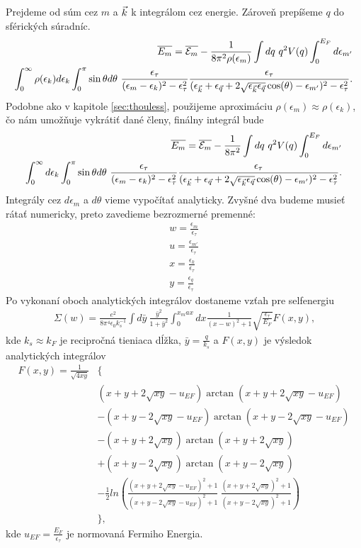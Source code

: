 Prejdeme od súm cez $m$ a $\vec{k}$ k integrálom cez energie. Zároveň prepíšeme $q$ do sférických súradníc. 
\begin{align}
\label{eq:05energy4}
\notag
\overline{E_m}=\overline{\E_m} - \frac{1}{8\pi^2\rho(\epsilon_m)} \int dq\ q^2 V(q) \int_0^{E_F} d\epsilon_{m'} \\
\int_0^{\infty} \rho(\epsilon_k) d \epsilon_k \int_0^\pi \sin\theta d\theta\ \frac{\epsilon_\tau}{(\epsilon_m-\epsilon_k)^2-\epsilon_\tau^2}\frac{\epsilon_\tau}{(\epsilon_{\vk}+\epsilon_{\vq}+2\sqrt{\epsilon_{\vk}\epsilon_{\vq}}\cos(\theta)-\epsilon_{m'})^2-\epsilon_\tau^2} \text{.} 
\end{align}
Podobne ako v kapitole \ref{sec:thouless}, použijeme aproximáciu $\rho(\epsilon_m)\approx\rho(\epsilon_k)$, čo nám umožňuje vykrátiť dané členy, finálny integrál bude
\begin{align}
\label{eq:05energy5}
\notag
\overline{E_m}=\overline{\mathcal{E}_m} - \frac{1}{8\pi^2} \int dq\ q^2 V(q) \int_0^{E_F} d\epsilon_{m'} \\
\int_0^{\infty} d \epsilon_k  \int_0^\pi \sin\theta d\theta\  \frac{\epsilon_\tau}{(\epsilon_m-\epsilon_k)^2-\epsilon_\tau^2}\frac{\epsilon_\tau}{(\epsilon_{\vec{k}}+\epsilon_{\vec{q}}+2\sqrt{\epsilon_{\vec{k}}\epsilon_{\vec{q}}}\cos(\theta)-\epsilon_{m'})^2-\epsilon_\tau^2} \text{.} 
\end{align}
Integrály cez $d\epsilon_m$ a $d\theta$ vieme vypočítať analyticky. Zvyšné dva budeme musieť rátať numericky, preto zavedieme bezrozmerné premenné:
\begin{align*}
w=\frac{\epsilon_m}{\epsilon_\tau} \\
u=\frac{\epsilon_{m'}}{\epsilon_\tau} \\
x=\frac{\epsilon_k}{\epsilon_\tau} \\
y=\frac{\epsilon_q}{\epsilon_\tau} 
\end{align*}
Po vykonaní oboch analytických integrálov dostaneme vzťah pre selfenergiu
\begin{align}
\label{eq:05selfenergy}
\Sigma(w)=\frac{e^2}{8\pi^4\epsilon_0 k_s^{-1}} \int d\bar{y}\ \frac{\bar{y}^2}{1+\bar{y}^2}\int_0^{x_max} dx \frac{1}{(x-w)^2+1}\sqrt{\frac{\epsilon_\tau}{E_F}}F(x,y) \text{,}
\end{align}
kde $k_s\approx k_F$ je recipročná tieniaca dĺžka, $\bar{y}=\frac{q}{k_s}$  a $F(x,y)$ je výsledok analytických integrálov
\begin{align*}
F(x,y)=\frac{1}{\sqrt{4xy}}&\{ \\
&(x+y+2\sqrt{xy}-u_{EF})\arctan(x+y+2\sqrt{xy}-u_{EF}) \\
&-(x+y-2\sqrt{xy}-u_{EF})\arctan(x+y-2\sqrt{xy}-u_{EF}) \\
&-(x+y+2\sqrt{xy})\arctan(x+y+2\sqrt{xy}) \\
&+(x+y-2\sqrt{xy})\arctan(x+y-2\sqrt{xy}) \\
&-\frac{1}{2}ln(\frac{(x+y+2\sqrt{xy}-u_{EF})^2+1}{(x+y-2\sqrt{xy}-u_{EF})^2+1}\ \frac{(x+y+2\sqrt{xy})^2+1}{(x+y-2\sqrt{xy})^2+1})\\
&\}\text{,}
\end{align*}
kde $u_{EF}=\frac{E_F}{\epsilon_\tau}$ je normovaná Fermiho Energia.

